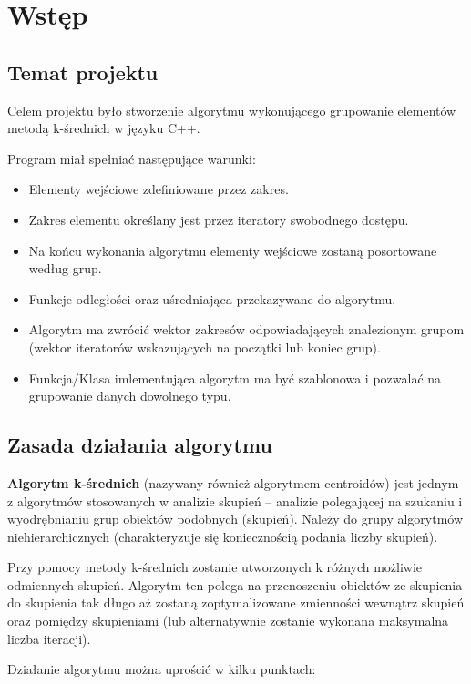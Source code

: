 \section{Wstęp}

\subsection{Temat projektu}

Celem projektu było stworzenie algorytmu wykonującego grupowanie elementów metodą
k-średnich w języku C++.

Program miał spełniać następujące warunki:

\begin{itemize}
	\item Elementy wejściowe zdefiniowane przez zakres.
	\item Zakres elementu określany jest przez iteratory swobodnego dostępu.
	\item Na końcu wykonania algorytmu elementy wejściowe zostaną posortowane według grup.
	\item Funkcje odległości oraz uśredniająca przekazywane do algorytmu.
	\item Algorytm ma zwrócić wektor zakresów odpowiadających znalezionym grupom (wektor iteratorów wskazujących na początki lub koniec grup).
	\item Funkcja/Klasa imlementująca algorytm ma być szablonowa i pozwalać na grupowanie danych dowolnego typu.
\end{itemize}

\subsection{Zasada działania algorytmu}\label{algorithm}

\textbf{Algorytm k-średnich} (nazywany również algorytmem centroidów) jest jednym z algorytmów stosowanych w analizie skupień --  analizie polegającej na szukaniu i wyodrębnianiu grup obiektów podobnych (skupień). Należy do grupy algorytmów niehierarchicznych (charakteryzuje się koniecznością podania liczby skupień).

Przy pomocy metody k-średnich zostanie utworzonych k różnych możliwie odmiennych skupień. Algorytm ten polega na przenoszeniu obiektów ze skupienia do skupienia tak długo aż zostaną zoptymalizowane zmienności wewnątrz skupień oraz pomiędzy skupieniami (lub alternatywnie zostanie wykonana maksymalna liczba iteracji).

Działanie algorytmu można uprościć w kilku punktach:

